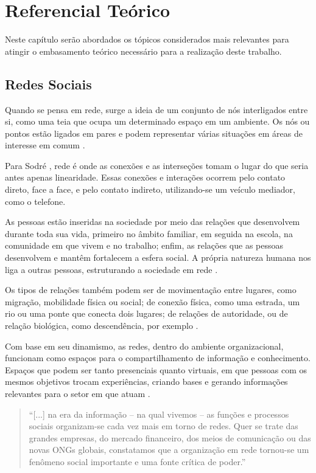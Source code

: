 \chapter{Referencial Teórico}

Neste capítulo serão abordados os tópicos considerados mais relevantes para atingir o embasamento teórico necessário para a realização deste trabalho.

\section{Redes Sociais}

Quando se pensa em rede, surge a ideia de um conjunto de nós interligados entre si, como uma teia que ocupa um determinado espaço em um ambiente. Os nós ou pontos estão ligados em pares e podem representar várias situações em áreas de interesse em comum \cite{Newman:2010}.

Para Sodré \cite{Sodre:2002}, rede é onde as conexões e as interseções tomam o lugar do que seria antes apenas linearidade. Essas conexões e interações ocorrem pelo contato direto, face a face, e pelo contato indireto, utilizando-se um veículo mediador, como o telefone.

As pessoas estão inseridas na sociedade por meio das relações que desenvolvem durante toda sua vida, primeiro no âmbito familiar, em seguida na escola, na comunidade em que vivem e no trabalho; enfim, as relações que as pessoas desenvolvem e mantêm fortalecem a esfera social. A própria natureza humana nos liga a outras pessoas, estruturando a sociedade em rede \cite{Tomae:Alcara:Chiara:2005}.

Os tipos de relações também podem ser de movimentação entre lugares, como migração, mobilidade física ou social; de conexão física, como uma estrada, um rio ou uma ponte que conecta dois lugares; de relações de autoridade, ou de relação biológica, como descendência, por exemplo \cite{Wasserman:1994}.

Com base em seu dinamismo, as redes, dentro do ambiente organizacional, funcionam como espaços para o compartilhamento de informação e conhecimento. Espaços que podem ser tanto presenciais quanto virtuais, em que pessoas com os mesmos objetivos trocam experiências, criando bases e gerando informações relevantes para o setor em que atuam \cite{Tomae:Alcara:Chiara:2005}.

\begin{quote}
	``[...] na era da informação – na qual vivemos – as
	funções e processos sociais organizam-se cada vez
	mais em torno de redes. Quer se trate das grandes
	empresas, do mercado financeiro, dos meios de
	comunicação ou das novas ONGs globais,
	constatamos que a organização em rede tornou-se
	um fenômeno social importante e uma fonte crítica
	de poder.'' \cite{Capra:2002}
\end{quote}

